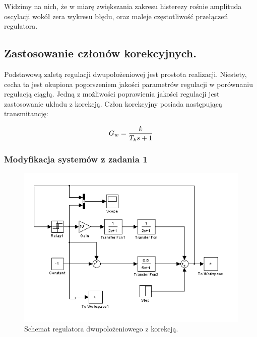 \documentclass[a4paper,10pt]{article}
\begin{document}
\newpage Widzimy na nich, że w miarę zwiększania zakresu histerezy rośnie amplituda oscylacji wokół zera wykresu błędu, oraz maleje częstotliwość przełączeń regulatora.


\subsection{Zastosowanie członów korekcyjnych.}\label{sec:zad2}
Podstawową zaletą regulacji dwupołożeniowej jest prostota realizacji. Niestety, cecha ta jest
okupiona pogorszeniem jakości parametrów regulacji w porównaniu regulacją ciągłą.
Jedną z możliwości poprawienia jakości regulacji jest zastosowanie układu z korekcją.
\newline
Człon korekcyjny posiada następującą transmitancję:

\begin{equation} \label{eqn:trans_czl_kor}
	G_w={{k} \over {T_k s+1}}
\end{equation}

\subsubsection{Modyfikacja systemów z zadania 1}\label{sec:zad2_1}
\begin{figure}[!h]
    \centering
	\includegraphics[width=120mm]{CW3-schemat-2k.png}
	\caption{Schemat regulatora dwupolożeniowego z korekcją.}
    \label{fig:Rysunek}
\end{figure}
\end{document}
